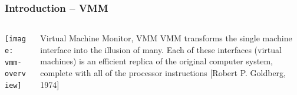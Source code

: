 \begin{frame}[plain]
	\frametitle{Introduction -- VMM}
	
	
	
	\begin{columns}
		
		\begin{column}{.5\textwidth}
			
			\texttt{[image: vmm-overview]}
			
		\end{column}
		
		\begin{column}{.5\textwidth}
			
			\begin{block}{Virtual Machine Monitor, VMM}
	VMM transforms the single machine interface into the illusion of many. Each of these interfaces (virtual machines) is an efficient replica of the original computer system, complete with all of the processor instructions [Robert P. Goldberg, 1974]
			\end{block}
			
		\end{column}
		
		
	\end{columns}
	
	
\end{frame}

